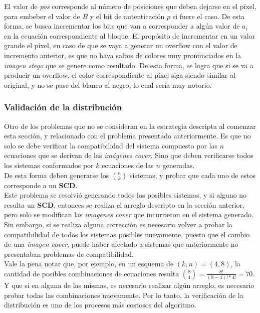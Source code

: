 \documentclass{article}
\begin{document}
El valor de \emph{pos} corresponde al número de posiciones que deben dejarse en el píxel, para embeber el valor de $B$ y el bit de autenticación $p$ si
fuere el caso. De esta forma, se busca incrementar los bits que van a corresponder a algún valor de $a_i$ en la ecuación correspondiente al bloque.
El propósito de incrementar en un valor grande el píxel, en caso de que se vaya a generar un overflow con el valor de incremento anterior, es
que no haya saltos de colores muy pronunciados en la \emph{imagen stego} que se genere como resultado. De esta forma, se logra que si se va a producir
un overflow, el color correspondiente al píxel siga siendo similar al original, y no se pase del blanco al negro, lo cual sería muy notorio.

\subsubsection{Validación de la distribución}
Otro de los problemas que no se consideran en la estrategia descripta al comenzar esta sección, y relacionado con el problema presentado
anteriormente. Es que no solo se debe verificar la compatibilidad del sistema compuesto por las $n$ ecuaciones que se derivan de las 
\emph{imágenes cover}. Sino que deben verificarse todos los sistemas conformados por $k$ ecuaciones de las $n$ generadas.\\

De esta forma deben generarse los $\displaystyle {n \choose k}$ sistemas, y probar que cada uno de estos corresponde a un \textbf{SCD}.\\

Este problema se resolvió generando todos los posibles sistemas, y si alguno no resulta un \textbf{SCD}, entonces se realiza el arreglo
descripto en la sección anterior, pero solo se modifican las \emph{imagenes cover} que incurrieron en el sistema generado. Sin embargo,
si se realiza alguna corrección es necesario volver a probar la compatibilidad de todos los sistemas posibles nuevamente, puesto que el
cambio de una \emph{imagen cover}, puede haber afectado a sistemas que anteriormente no presentaban problemas de compatibilidad.\\

Vale la pena notar que, por ejemplo, en un esquema de $\displaystyle (k,n) = (4,8)$, la cantidad de posibles combinaciones de ecuaciones resulta
$\displaystyle {8 \choose 4} = \frac{8!}{(8-4)!*4!} = 70$. Y que si en alguna de las mismas, es necesario realizar algún arreglo, es necesario probar
todas las combinaciones nuevamente. Por lo tanto, la verificación de la distribución es uno de los procesos más costosos del algoritmo.
\end{document}
